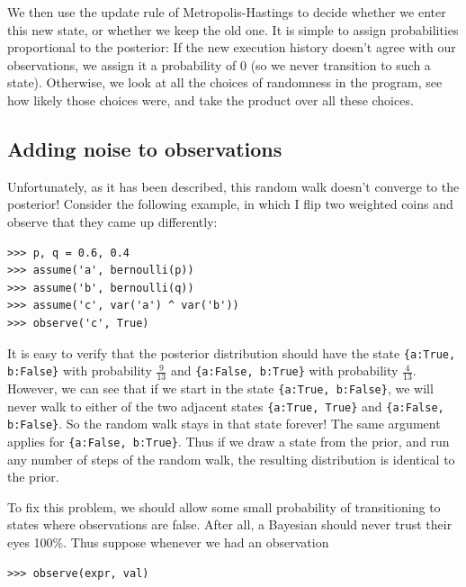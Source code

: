 \documentclass[11pt]{article}
\begin{document}
We then use the update rule of Metropolis-Hastings to decide whether we enter this new state, or whether we keep the old one.  It is simple to assign probabilities proportional to the posterior:  If the new execution history doesn't agree with our observations, we assign it a probability of 0 (so we never transition to such a state).  Otherwise, we look at all the choices of randomness in the program, see how likely those choices were, and take the product over all these choices.   

\subsection{Adding noise to observations}

Unfortunately, as it has been described, this random walk doesn't converge to the posterior!  Consider the following example, in which I flip two weighted coins and observe that they came up differently:  

\begin{small}
\begin{verbatim}
>>> p, q = 0.6, 0.4
>>> assume('a', bernoulli(p))
>>> assume('b', bernoulli(q))
>>> assume('c', var('a') ^ var('b'))
>>> observe('c', True)
\end{verbatim}
\end{small}

It is easy to verify that the posterior distribution should have the state {\tt \{a:True, b:False\}} with probability $\frac{9}{13}$ and {\tt \{a:False, b:True\}} with probability $\frac{4}{13}$.  However, we can see that if we start in the state {\tt \{a:True, b:False\}}, we will never walk to either of the two adjacent states {\tt \{a:True, True\}} and {\tt \{a:False, b:False\}}.  So the random walk stays in that state forever!  The same argument applies for {\tt \{a:False, b:True\}}.  Thus if we draw a state from the prior, and run any number of steps of the random walk, the resulting distribution is identical to the prior.  \vspace{6 pt}

To fix this problem, we should allow some small probability of transitioning to states where observations are false.  After all, a Bayesian should never trust their eyes 100\%.  Thus suppose whenever we had an observation

\begin{small}
\begin{verbatim}
>>> observe(expr, val)
\end{verbatim}
\end{small}
\end{document}
